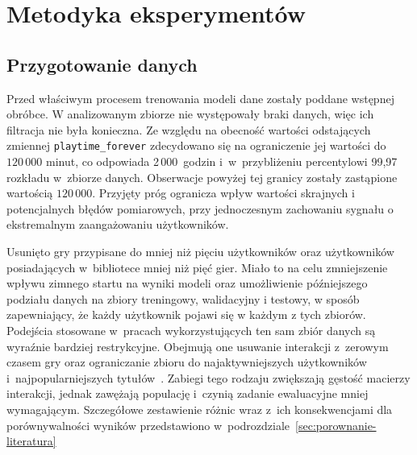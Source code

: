 \chapter{Metodyka eksperymentów}
\label{chap:metodologia}

\section{Przygotowanie danych}

Przed właściwym procesem trenowania modeli dane zostały poddane wstępnej obróbce. W analizowanym zbiorze nie występowały braki danych, więc ich filtracja nie była konieczna. Ze względu na obecność wartości odstających zmiennej \texttt{playtime\_forever} zdecydowano się na ograniczenie jej wartości do $120\,000$ minut, co odpowiada 2\,000~godzin i~w~przybliżeniu percentylowi 99{,}97 rozkładu w~zbiorze danych. Obserwacje powyżej tej granicy zostały zastąpione wartością $120\,000$. Przyjęty próg ogranicza wpływ wartości skrajnych i potencjalnych błędów pomiarowych, przy jednoczesnym zachowaniu sygnału o ekstremalnym zaangażowaniu użytkowników.

Usunięto gry przypisane do mniej niż pięciu użytkowników oraz użytkowników posiadających w~bibliotece mniej niż pięć gier. Miało to na celu zmniejszenie wpływu zimnego startu na wyniki modeli oraz umożliwienie późniejszego podziału danych na zbiory treningowy, walidacyjny i testowy, w sposób zapewniający, że każdy użytkownik pojawi się w każdym z tych zbiorów. Podejścia stosowane w~pracach wykorzystujących ten sam zbiór danych są wyraźnie bardziej restrykcyjne. Obejmują one usuwanie interakcji z~zerowym czasem gry oraz ograniczanie zbioru do najaktywniejszych użytkowników i~najpopularniejszych tytułów~\cite{bunga2021implicit,cheuque2019steam}. Zabiegi tego rodzaju zwiększają gęstość macierzy interakcji, jednak zawężają populację i~czynią zadanie ewaluacyjne mniej wymagającym. Szczegółowe zestawienie różnic wraz z~ich konsekwencjami dla porównywalności wyników przedstawiono w~podrozdziale~\ref{sec:porownanie-literatura}

